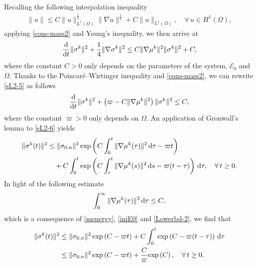 \documentclass[11pt,reqno]{amsart}
\def\d{{\rm d}}
\def\ddt{\frac{\d}{\d t}}
\begin{document}
%
Recalling the following interpolation inequality
%
\begin{align}
\| u\|\leq C \| u\|_{L^1(\Omega)}^\frac12 \| \nabla u\|^\frac12 + C \| u\|_{L^1(\Omega)}, \quad \forall \, u \in H^1(\Omega),
\label{int-L2-H1}
\end{align}
applying \eqref{cons-mass2} and Young's inequality, we then arrive at
%
\begin{equation}
\label{sL2-5}
\begin{split}
 \ddt \|\sigma^k \|^2 + \frac14 \|\nabla \sigma^k \|^2
\leq C\| \nabla \mu^k\|^2 \| \sigma^k\|^2 +C,
\end{split}
\end{equation}
%
where the constant $C>0$ only depends on the parameters of the system, $\mathcal{E}_0$ and $\Omega$.
Thanks to the Poincar\'{e}--Wirtinger inequality and \eqref{cons-mass2}, we can rewrite \eqref{sL2-5} as follows
%
\begin{equation}
\label{sL2-6}
\begin{split}
\ddt \|\sigma^k \|^2 + \left( \varpi - C \|\nabla \mu^k\|^2 \right) \| \sigma^k\|^2
\leq C,
\end{split}
\end{equation}
%
where the constant $\varpi>0$ only depends on $\Omega$.
An application of Gronwall's lemma to \eqref{sL2-6} yields
%
\begin{align}
\| \sigma^k(t)\|^2
&\leq \| \sigma_{0,n}\|^2 \, {\rm exp} \left(C \int_0^t \| \nabla \mu^k(\tau)\|^2 \, \d \tau - \varpi t \right)
\notag \\
&\quad + C \int_{0}^t {\rm exp} \left(  C \int_\tau^t \| \nabla \mu^k(s)\|^2 \, \d s - \varpi (t-\tau) \right) \, \d \tau,
\quad \forall \, t \geq 0.
\label{sigma-L2-0}
\end{align}
%
In light of the following estimate
%
\begin{equation}
\label{mu-int}
\int_{0}^\infty \| \nabla \mu^k (\tau)\|^2 \, \d \tau \leq C,
\end{equation}
%
which is a consequence of \eqref{menergy}, \eqref{iniE0} and \eqref{Lowerbd-2}, we find that
%
\begin{align}
\| \sigma^k(t)\|^2
&\leq \| \sigma_{0,n}\|^2 \, {\rm exp} \left( C-\varpi t \right)
+ C \int_{0}^t {\rm exp} \left(  C- \varpi (t-\tau) \right) \, \d \tau
\notag \\
&\leq \| \sigma_{0,n}\|^2 \, {\rm exp} \left( C -\varpi t  \right)
+ \frac{C}{\varpi} {\rm exp} \left(  C \right)
, \quad \forall \, t \geq 0.
\label{sigma-L2}
\end{align}
\end{document}
